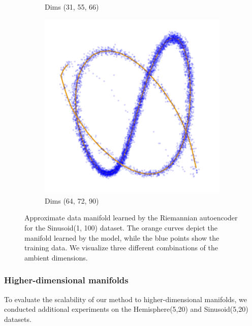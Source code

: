 \begin{figure}[htb]
\begin{subfigure}[b]{0.32\textwidth}
            \caption{Dims (31, 55, 66)}
        \end{subfigure}
        \hfill
        \begin{subfigure}[b]{0.32\textwidth}
            \centering
            \includegraphics[width=\textwidth]{chapter5/results/visualisations/RAE/projections/sinusoid_1_100/more_transparent/64_72_90.jpg}
            \caption{Dims (64, 72, 90)}
        \end{subfigure}
    
        \caption{
            Approximate data manifold learned by the Riemannian autoencoder for the Sinusoid(1, 100) dataset. The orange curves depict the manifold learned by the model, while the blue points show the training data. We visualize three different combinations of the ambient dimensions. %
        }
        \label{fig:learned_charts_for_Sinusoid_1_100}
    \end{figure}


    \subsubsection{Higher-dimensional manifolds}




    To evaluate the scalability of our method to higher-dimensional manifolds, we conducted additional experiments on the Hemisphere(5,20) and Sinusoid(5,20) datasets. 
    
